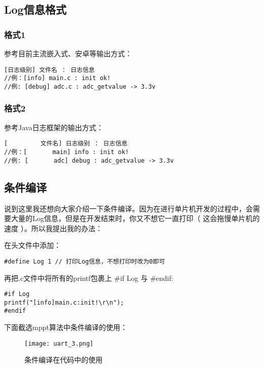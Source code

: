 \documentclass[cn,11pt]{elegantbook}
\begin{document}
\subsection{Log信息格式}

\subsubsection{格式1}

参考目前主流嵌入式、安卓等输出方式：

\lstset{ language=C}
\begin{lstlisting}
[日志级别] 文件名 ： 日志信息
//例：[info] main.c : init ok!
//例: [debug] adc.c : adc_getvalue -> 3.3v
\end{lstlisting}


\subsubsection{格式2}

参考Java日志框架的输出方式：

\lstset{ language=C}
\begin{lstlisting}
[         文件名] 日志级别 ： 日志信息
//例：[       main] info : init ok!
//例: [       adc] debug : adc_getvalue -> 3.3v
\end{lstlisting}

\subsection{条件编译}

说到这里我还想向大家介绍一下条件编译。因为在进行单片机开发的过程中，会需要大量的Log信息，但是在开发结束时，你又不想它一直打印（ 这会拖慢单片机的速度 ）。所以我提出我的办法：

在头文件中添加：
\lstset{  language=C}
\begin{lstlisting}
#define Log 1 // 打印Log信息，不想打印时改为0即可
\end{lstlisting}

再把.c文件中将所有的printf包裹上 \#if Log  与 \#endif:

\lstset{ language=C}
\begin{lstlisting}
#if Log 
printf("[info]main.c:init!\r\n");
#endif
\end{lstlisting}

下面截选mppt算法中条件编译的使用：
\begin{figure}[htbp]
	\centering
	\texttt{[image: uart\_3.png]}
	\caption{条件编译在代码中的使用\label{fig:scatter}}
\end{figure}
\end{document}
